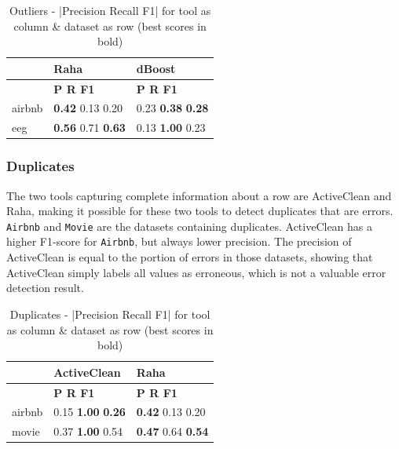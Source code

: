 \begin{table}[H]
\centering
\caption{Outliers - |Precision Recall F1| for tool as column \& dataset as row (best scores in bold)}
\begin{adjustbox}{center}
\begin{tabular}{lll}
\toprule
{} & Raha & dBoost \\
\midrule
 & \textbf{\space\space\space P \space\space\space\space R \space\space\space F1} & \textbf{\space\space\space P \space\space\space\space R \space\space\space F1} \\
airbnb & \textbf{0.42} 0.13 0.20 & 0.23 \textbf{0.38} \textbf{0.28} \\
eeg & \textbf{0.56} 0.71 \textbf{0.63} & 0.13 \textbf{1.00} 0.23 \\
\bottomrule
\end{tabular}
\end{adjustbox}

\end{table}

\subsubsection{Duplicates}
The two tools capturing complete information about a row are ActiveClean and Raha, making it possible for these two tools to detect duplicates that are errors. \verb|Airbnb| and \verb|Movie| are the datasets containing duplicates. ActiveClean has a higher F1-score for \verb|Airbnb|, but always lower precision. The precision of ActiveClean is equal to the portion of errors in those datasets, showing that ActiveClean simply labels all values as erroneous, which is not a valuable error detection result. 

\begin{table}[H]
\centering
\caption{Duplicates - |Precision Recall F1| for tool as column \& dataset as row (best scores in bold)}
\begin{adjustbox}{center}
\begin{tabular}{lll}
\toprule
{} & ActiveClean & Raha \\
\midrule
 & \textbf{\space\space\space P \space\space\space\space R \space\space\space F1} & \textbf{\space\space\space P \space\space\space\space R \space\space\space F1} \\
airbnb & 0.15 \textbf{1.00} \textbf{0.26} & \textbf{0.42} 0.13 0.20 \\
movie & 0.37 \textbf{1.00} 0.54 & \textbf{0.47} 0.64 \textbf{0.54} \\
\bottomrule
\end{tabular}
\end{adjustbox}
\end{table}

